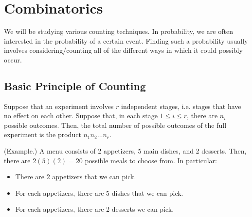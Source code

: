 \section{Combinatorics}
We will be studying various counting techniques. In probability, we are often interested in the probability of a certain event. Finding such a probability usually involves considering/counting all of the different ways in which it could possibly occur. 

\subsection{Basic Principle of Counting}
Suppose that an experiment involves $r$ independent stages, i.e. stages that have no effect on each other. Suppose that, in each stage $1 \leq i \leq r$, there are $n_i$ possible outcomes. Then, the total number of possible outcomes of the full experiment is the product $n_1 n_2 \dots n_r$. 

\begin{mdframed}[]
    (Example.) A menu consists of 2 appetizers, 5 main dishes, and 2 desserts. Then, there are $2(5)(2) = 20$ possible meals to choose from. In particular: 
    \begin{itemize}
        \item There are 2 appetizers that we can pick. 
        \item For each appetizers, there are 5 dishes that we can pick.
        \item For each appetizers, there are 2 desserts we can pick. 
    \end{itemize}
\end{mdframed}

